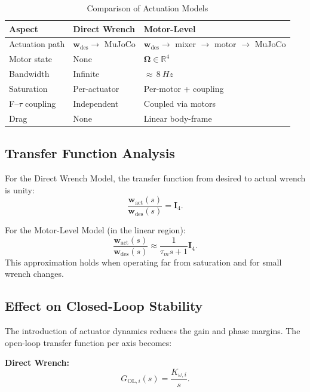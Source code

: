 \documentclass[journal]{IEEEtran}
\newcommand{\w}{\mathbf{w}}
\newcommand{\I}{\mathbf{I}}
\newcommand{\bOmega}{\boldsymbol{\Omega}}
\begin{document}
\begin{table}[!t]
  \centering
  \caption{Comparison of Actuation Models}
  \label{tab:comparison}
  \begin{tabular}{@{}p{2cm}p{2.5cm}p{2.5cm}@{}}
    \toprule
    Aspect & Direct Wrench & Motor-Level \\
    \midrule
    Actuation path & $\w_{\text{des}} \to$ MuJoCo & $\w_{\text{des}} \to$ mixer $\to$ motor $\to$ MuJoCo \\
    Motor state & None & $\bOmega \in \mathbb{R}^4$ \\
    Bandwidth & Infinite & ${\approx}\,\SI{8}{Hz}$ \\
    Saturation & Per-actuator & Per-motor + coupling \\
    F--$\tau$ coupling & Independent & Coupled via motors \\
    Drag & None & Linear body-frame \\
    \bottomrule
  \end{tabular}
\end{table}

\subsection{Transfer Function Analysis}

For the Direct Wrench Model, the transfer function from desired to actual wrench is unity:
\begin{equation}
  \frac{\w_{\text{act}}(s)}{\w_{\text{des}}(s)} = \I_4.
  \label{eq:tf_direct}
\end{equation}

For the Motor-Level Model (in the linear region):
\begin{equation}
  \frac{\w_{\text{act}}(s)}{\w_{\text{des}}(s)} \approx \frac{1}{\tau_m s + 1} \I_4.
  \label{eq:tf_motor}
\end{equation}
This approximation holds when operating far from saturation and for small wrench changes.

\subsection{Effect on Closed-Loop Stability}

The introduction of actuator dynamics reduces the gain and phase margins. The open-loop transfer function per axis becomes:

\textbf{Direct Wrench:}
\begin{equation}
  G_{\text{OL},i}(s) = \frac{K_{\omega,i}}{s}.
  \label{eq:gol_direct}
\end{equation}
\end{document}
